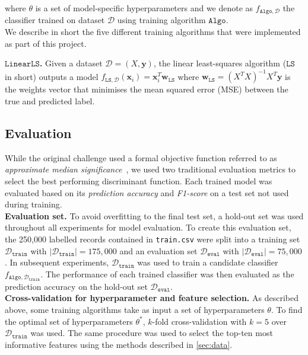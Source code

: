 \documentclass[10pt,conference,compsocconf]{IEEEtran}
\newcommand{\parabf}[1]{\vspace{1mm}\noindent\textbf{#1}}
\newcommand{\Data}{\mathcal{D}}
\newcommand{\Deval}{\mathcal{D}_{\mathtt{eval}}}
\newcommand{\Dtrain}{\mathcal{D}_{\mathtt{train}}}
\newcommand{\features}{\mathbf{x}_i}
\newcommand{\targetvector}{\mathbf{y}}
\newcommand{\weights}{\mathbf{w}}
\newcommand{\classifier}[2]{f_{#1, #2}}
\newcommand{\Train}{\mathtt{Algo}}
\newcommand{\LS}{\mathtt{LS}}
\begin{document}
where $\theta$ is a set of model-specific hyperparameters and we denote as $\classifier{\Train}{\Data}$ the classifier trained on dataset $\Data$ using training algorithm $\Train$.\\

We describe in short the five different training algorithms that were implemented as part of this project.

\parabf{$\mathtt{LinearLS}$.} Given a dataset $\Data = (X, \targetvector)$, the linear least-squares algorithm ($\LS$ in short) outputs a model $\classifier{\LS}{\Data}(\features) = \features^T \weights_{\LS}$ where $\weights_{\LS} = (X^T X)^{-1}X^T \targetvector$ is the weights vector that minimises the mean squared error (MSE) between the true and predicted label.

\subsection{Evaluation}
While the original challenge used a formal objective function referred to as \emph{approximate median significance}~\cite{HiggsML}, we used two traditional evaluation metrics to select the best performing discriminant function. Each trained model was evaluated based on its \emph{prediction accuracy} and \emph{F1-score} on a test set not used during training.\\

\parabf{Evaluation set.} To avoid overfitting to the final test set, a hold-out set was used throughout all experiments for model evaluation. To create this evaluation set, the 250,000 labelled records contained in \texttt{train.csv} were split into a training set $\Dtrain$ with $|\Dtrain| = 175,000$ and an evaluation set $\Deval$ with $|\Deval| = 75,000$. In subsequent experiments, $\Dtrain$ was used to train a candidate classifier $\classifier{\Train}{\Dtrain}$. The performance of each trained classifier was then evaluated as the prediction accuracy on the hold-out set $\Deval$.\\

\parabf{Cross-validation for hyperparameter and feature selection.} As described above, some training algorithms take as input a set of hyperparameters $\theta$. To find the optimal set of hyperparameters $\theta^*$, $k$-fold cross-validation with $k=5$ over $\Dtrain$ was used. The same procedure was used to select the top-ten most informative features using the methods described in \autoref{sec:data}.\\
  
\end{document}
